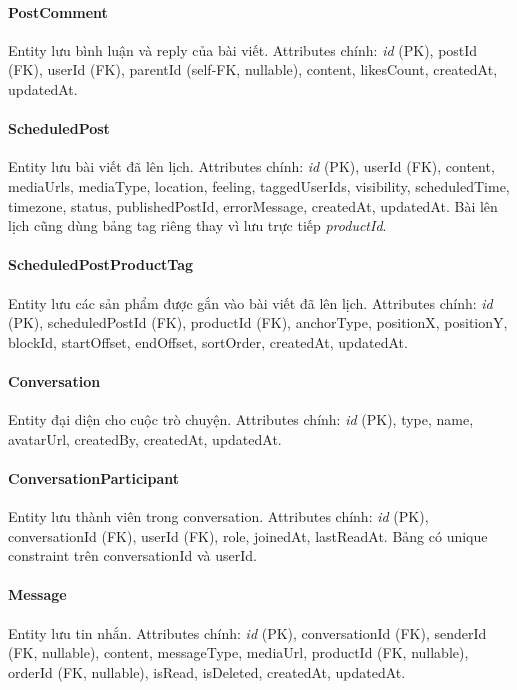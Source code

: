 \paragraph{PostComment} Entity lưu bình luận và reply của bài viết. Attributes chính: \textit{id} (PK), postId (FK), userId (FK), parentId (self-FK, nullable), content, likesCount, createdAt, updatedAt.

\paragraph{ScheduledPost} Entity lưu bài viết đã lên lịch. Attributes chính: \textit{id} (PK), userId (FK), content, mediaUrls, mediaType, location, feeling, taggedUserIds, visibility, scheduledTime, timezone, status, publishedPostId, errorMessage, createdAt, updatedAt. Bài lên lịch cũng dùng bảng tag riêng thay vì lưu trực tiếp \textit{productId}.

\paragraph{ScheduledPostProductTag} Entity lưu các sản phẩm được gắn vào bài viết đã lên lịch. Attributes chính: \textit{id} (PK), scheduledPostId (FK), productId (FK), anchorType, positionX, positionY, blockId, startOffset, endOffset, sortOrder, createdAt, updatedAt.

\paragraph{Conversation} Entity đại diện cho cuộc trò chuyện. Attributes chính: \textit{id} (PK), type, name, avatarUrl, createdBy, createdAt, updatedAt.

\paragraph{ConversationParticipant} Entity lưu thành viên trong conversation. Attributes chính: \textit{id} (PK), conversationId (FK), userId (FK), role, joinedAt, lastReadAt. Bảng có unique constraint trên conversationId và userId.

\paragraph{Message} Entity lưu tin nhắn. Attributes chính: \textit{id} (PK), conversationId (FK), senderId (FK, nullable), content, messageType, mediaUrl, productId (FK, nullable), orderId (FK, nullable), isRead, isDeleted, createdAt, updatedAt.

